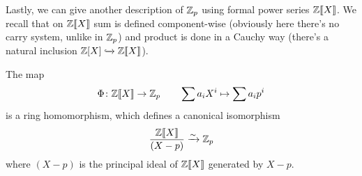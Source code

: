 		Lastly, we can give another description of $\mathbb{Z}_p$ using formal power series $\mathbb{Z}\llbracket X \rrbracket$. We recall that on $\mathbb{Z}\llbracket X \rrbracket$ sum is defined component-wise (obviously here there's no carry system, unlike in $\mathbb{Z}_p$) and product is done in a Cauchy way (there's a natural inclusion $\mathbb{Z}[X] \xhookrightarrow{} \mathbb{Z}\llbracket {X} \rrbracket$).
		\begin{thm}
			The map
			\begin{gather*}
				 \Phi\colon \mathbb{Z}\llbracket X \rrbracket \to \mathbb{Z}_p   \qquad \sum a_iX^i \mapsto \sum a_ip^i
			\end{gather*}
			is a ring homomorphism, which defines a canonical isomorphism
			\begin{gather*}
				\frac{\mathbb{Z}\llbracket {X} \rrbracket}{(X - p)} \xrightarrow{\sim} \mathbb{Z}_p
			\end{gather*}
			where $(X - p)$ is the principal ideal of $\mathbb{Z}\llbracket X \rrbracket$ generated by $X - p$.
		\end{thm}
